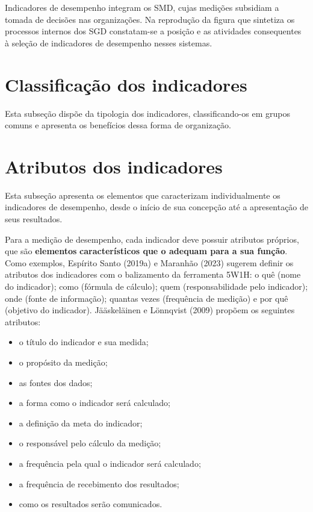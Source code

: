 \documentclass[
  letterpaper,
  DIV=11,
  numbers=noendperiod]{scrreprt}
\begin{document}
Indicadores de desempenho integram os SMD, cujas medições subsidiam a
tomada de decisões nas organizações. Na reprodução da figura que
sintetiza os processos internos dos SGD constatam-se a posição e as
atividades consequentes à seleção de indicadores de desempenho nesses
sistemas.

\hypertarget{classificauxe7uxe3o-dos-indicadores}{%
\chapter{Classificação dos
indicadores}\label{classificauxe7uxe3o-dos-indicadores}}

{Esta subseção dispõe da tipologia dos indicadores, classificando-os em
grupos comuns e apresenta os benefícios dessa forma de organização.}

\hypertarget{atributos-dos-indicadores}{%
\chapter{Atributos dos indicadores}\label{atributos-dos-indicadores}}

{Esta subseção apresenta os elementos que caracterizam individualmente
os indicadores de desempenho, desde o início de sua concepção até a
apresentação de seus resultados.}

Para a medição de desempenho, cada indicador deve possuir atributos
próprios, que são \textbf{elementos} \textbf{característicos que o
adequam para a sua função}. Como exemplos, Espírito Santo (2019a) e
Maranhão (2023) sugerem definir os atributos dos indicadores com o
balizamento da ferramenta 5W1H: o quê (nome do indicador); como (fórmula
de cálculo); quem (responsabilidade pelo indicador); onde (fonte de
informação); quantas vezes (frequência de medição) e por quê (objetivo
do indicador). Jääskeläinen e Lönnqvist (2009) propõem os seguintes
atributos:

\begin{itemize}
\item
  o título do indicador e sua medida;
\item
  o propósito da medição;
\item
  as fontes dos dados;
\item
  a forma como o indicador será calculado;
\item
  a definição da meta do indicador;
\item
  o responsável pelo cálculo da medição;
\item
  a frequência pela qual o indicador será calculado;
\item
  a frequência de recebimento dos resultados;
\item
  como os resultados serão comunicados.
\end{itemize}
\end{document}
